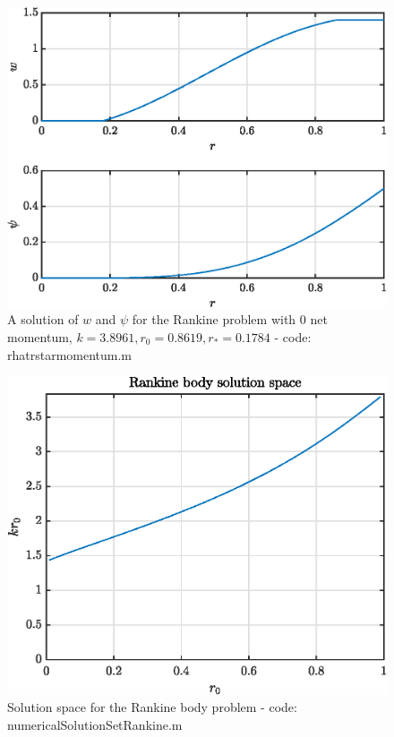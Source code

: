 \documentclass{X:/Documents/Coding/Latex/myreport}
\begin{document}
\begin{figure}[h]
    \centering
    \includegraphics[width=\linewidth]{Plots/rankineExample.eps}
    \caption{A solution of $w$ and $\psi$ for the Rankine problem with $0$ net momentum, $k = 3.8961, r_0 = 0.8619, r_* = 0.1784$ - code: rhatrstarmomentum.m}
    \label{fig:rankineExample}
\end{figure}






\begin{figure}[h]
    \centering
    \includegraphics[width=\linewidth]{Plots/rankineSolutionSet.eps}
    \caption{Solution space for the Rankine body problem - code: numericalSolutionSetRankine.m}
    \label{fig:rankineSolutions}
\end{figure}
\end{document}
